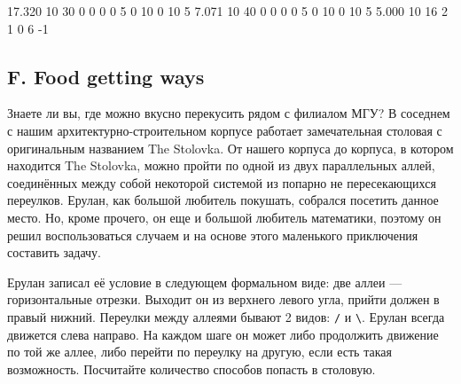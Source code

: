 
{17.320}
{10 30   0 0  0 0  5 0  10 0  10 5}
{7.071}
{10 40   0 0  0 0  5 0  10 0  10 5}
{5.000}
{10 16   2 1  0 6}
{-1}



\subsection*{F. Food getting ways}

Знаете ли вы, где можно вкусно перекусить рядом с филиалом МГУ? В соседнем с нашим архитектурно\--строительном корпусе работает замечательная столовая с оригинальным названием The Stolovka. От нашего корпуса до корпуса, в котором находится The Stolovka, можно пройти по одной из двух параллельных аллей, соединённых между собой некоторой системой из попарно не пересекающихся переулков. Ерулан, как большой любитель покушать, собрался посетить данное место. Но, кроме прочего, он еще и большой любитель математики, поэтому он решил воспользоваться случаем и на основе этого маленького приключения составить задачу. 




Ерулан записал её условие в следующем формальном виде: две аллеи --- горизонтальные отрезки. Выходит он из верхнего левого угла, прийти должен в правый нижний. Переулки между аллеями бывают 2 видов: {\tt /} и {\tt \textbackslash}. Ерулан всегда движется слева направо. На каждом шаге он может либо продолжить движение по той же аллее, либо перейти по переулку на другую, если есть такая возможность. Посчитайте количество способов попасть в столовую.

